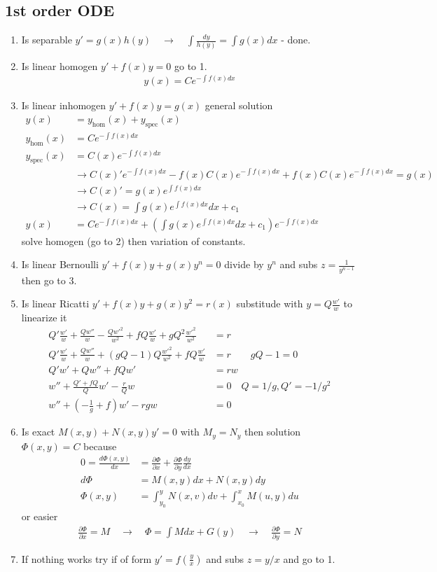 \documentclass[../main.tex]{subfiles}
\begin{document}
\newpage
\subsection{1st order ODE}
\begin{enumerate}
\item Is separable $y'=g(x)h(y)\quad\rightarrow\quad \int\frac{dy}{h(y)}=\int g(x)dx$ - done.
\item Is linear homogen $y'+f(x)y=0$ go to 1.
\begin{align}
y(x)=Ce^{-\int f(x)dx}
\end{align}
\item Is linear inhomogen $y'+f(x)y=g(x)$ general solution
\begin{align}
y(x)&=y_\text{hom}(x)+y_\text{spec}(x)\\
y_\text{hom}(x)&=Ce^{-\int f(x)dx}\\
y_\text{spec}(x)&=C(x)e^{-\int f(x)dx}\\
&\rightarrow C(x)'e^{-\int f(x)dx}-f(x)C(x)e^{-\int f(x)dx}+f(x)C(x)e^{-\int f(x)dx}=g(x)\\
&\rightarrow C(x)'=g(x)e^{\int f(x)dx}\\
&\rightarrow C(x)=\int g(x)e^{\int f(x)dx}dx+c_1\\
y(x)&=Ce^{-\int f(x)dx}+\left(\int g(x)e^{\int f(x)dx}dx+c_1\right)e^{-\int f(x)dx}
\end{align}
solve homogen (go to 2) then variation of constants.
\item Is linear Bernoulli $y'+f(x)y+g(x)y^n=0$ divide by $y^n$ and subs $z=\frac{1}{y^{n-1}}$ then go to 3.
\item Is linear Ricatti $y'+f(x)y+g(x)y^2=r(x)$ substitude with $y=Q\frac{w'}{w}$ to linearize it
\begin{align}
Q'\frac{w'}{w}+\frac{Qw''}{w}-\frac{Q{w'}^2}{w^2}+fQ\frac{w'}{w}+gQ^2\frac{{w'}^2}{w^2}&=r\\
Q'\frac{w'}{w}+\frac{Qw''}{w}+\left(gQ-1\right)Q\frac{{w'}^2}{w^2}+fQ\frac{w'}{w}&=r\qquad gQ-1=0\\
Q'w'+Qw''+fQw'&=rw\\
w''+\frac{Q'+fQ}{Q}w'-\frac{r}{Q}w&=0\quad Q=1/g, Q'=-1/g^2\\
w''+\left(-\frac{1}{g}+f\right)w'-rgw&=0
\end{align}
\item Is exact $M(x,y)+N(x,y)y'=0$ with $M_y=N_y$ then solution $\Phi(x,y)=C$ because
\begin{align}
0=\frac{d\Phi(x,y)}{dx}&=\frac{\partial\Phi}{\partial x}+\frac{\partial\Phi}{\partial y}\frac{dy}{dx}\\
d\Phi&=M(x,y)dx+N(x,y)dy\\
\Phi(x,y)&=\int_{y_0}^yN(x,v)dv+\int_{x_0}^xM(u,y)du
\end{align}
or easier
\begin{align}
\frac{\partial\Phi}{\partial x}=M\quad\rightarrow\quad\Phi=\int M dx+G(y)\quad\rightarrow\quad\frac{\partial\Phi}{\partial y}=N
\end{align}
\item If nothing works try if of form $y'=f\left(\frac{y}{x}\right)$ and subs $z=y/x$ and go to 1.


\end{enumerate}
\end{document}
